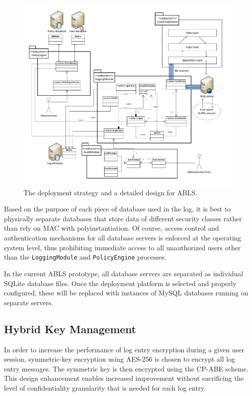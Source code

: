 \documentclass{sig-alternate}
\begin{document}
\begin{figure}[htb!]
\label{fig:deployment}
\begin{center}
\includegraphics[width=7in]{images/design.pdf}
\caption{The deployment strategy and a detailed design for ABLS.}
\end{center}
\end{figure}

Based on the purpose of each piece of database used in the log, it is best to physically separate databases
that store data of different security classes rather than rely on MAC with polyinstantiation. Of course, access control
and authentication mechanisms for all database servers is enforced at the operating system level, thus
prohibiting immediate access to all unauthorized users other than the {\tt LoggingModule} and {\tt PolicyEngine} 
processes. 

In the current ABLS prototype, all database servers are separated as individual SQLite database files. Once
the deployment platform is selected and properly configured, these will be replaced with instances of MySQL 
databases running on separate servers.

\subsection{Hybrid Key Management}
\label{sec:keyMgmt}
In order to increase the performance of log entry encryption during a given user session, symmetric-key encryption
using AES-256 is chosen to encrypt all log entry messages. The symmetric key is then encrypted using the CP-ABE
scheme. This design enhancement enables increased improvement without sacrificing the level of confidentiality 
granularity that is needed for each log entry. 
\end{document}
